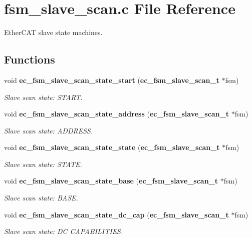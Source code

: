 \section{fsm\-\_\-slave\-\_\-scan.\-c \-File \-Reference}
\label{fsm__slave__scan_8c}


\-Ether\-C\-A\-T slave state machines.  


\subsection*{\-Functions}
\begin{DoxyCompactItemize}
\item 
void {\bf ec\-\_\-fsm\-\_\-slave\-\_\-scan\-\_\-state\-\_\-start} ({\bf ec\-\_\-fsm\-\_\-slave\-\_\-scan\-\_\-t} $\ast$fsm)
\begin{DoxyCompactList}\small\item\em \-Slave scan state\-: \-S\-T\-A\-R\-T. \end{DoxyCompactList}\item 
void {\bf ec\-\_\-fsm\-\_\-slave\-\_\-scan\-\_\-state\-\_\-address} ({\bf ec\-\_\-fsm\-\_\-slave\-\_\-scan\-\_\-t} $\ast$fsm)
\begin{DoxyCompactList}\small\item\em \-Slave scan state\-: \-A\-D\-D\-R\-E\-S\-S. \end{DoxyCompactList}\item 
void {\bf ec\-\_\-fsm\-\_\-slave\-\_\-scan\-\_\-state\-\_\-state} ({\bf ec\-\_\-fsm\-\_\-slave\-\_\-scan\-\_\-t} $\ast$fsm)
\begin{DoxyCompactList}\small\item\em \-Slave scan state\-: \-S\-T\-A\-T\-E. \end{DoxyCompactList}\item 
void {\bf ec\-\_\-fsm\-\_\-slave\-\_\-scan\-\_\-state\-\_\-base} ({\bf ec\-\_\-fsm\-\_\-slave\-\_\-scan\-\_\-t} $\ast$fsm)
\begin{DoxyCompactList}\small\item\em \-Slave scan state\-: \-B\-A\-S\-E. \end{DoxyCompactList}\item 
void {\bf ec\-\_\-fsm\-\_\-slave\-\_\-scan\-\_\-state\-\_\-dc\-\_\-cap} ({\bf ec\-\_\-fsm\-\_\-slave\-\_\-scan\-\_\-t} $\ast$fsm)
\begin{DoxyCompactList}\small\item\em \-Slave scan state\-: \-D\-C \-C\-A\-P\-A\-B\-I\-L\-I\-T\-I\-E\-S. \end{DoxyCompactList}\item 

\end{DoxyCompactItemize}
